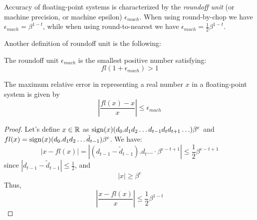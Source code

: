 \begin{definition}
    Accuracy of floating-point systems is characterized by the \textit{roundoff unit} (or machine precision, or machine epsilon) $\epsilon_{mach}$. When using round-by-chop we have $\epsilon_{mach} = \beta^{1-t}$, while when using round-to-nearest we have $\epsilon_{mach} = \frac{1}{2}\beta^{1-t}$.
\end{definition}

Another definition of roundoff unit is the following:
\begin{definition}
    The roundoff unit $\epsilon_{mach}$ is the smallest positive number satisfying:
    $$ fl(1+\epsilon_{mach}) > 1 $$
\end{definition}

\begin{proposition}
    The maximum relative error in representing a real number $x$ in a floating-point system is given by
    $$ \left| \frac{fl(x) - x}{x} \right| \leq \epsilon_{mach} $$
\end{proposition}

\begin{proof}
    Let's define $x \in \mathbb{R}$ as $\mathrm{sign}(x)(d_0.d_1d_2 \hdots d_{t-1}d_{t}d_{t+1} \hdots)\beta^{e}$ and $fl(x) = \mathrm{sign}(x)(d_0.d_1d_2 \hdots \tilde{d}_{t-1})\beta^{e}$. We have:
    $$ |x - fl(x)| = |(d_{t-1}-\tilde{d}_{t-1}).d_{t} \hdots \cdot \beta^{e-t+1}| \leq \frac{1}{2}\beta^{e-t+1} $$
    since $|d_{t-1} - \tilde{d}_{t-1}| \leq \frac{1}{2}$, and
    $$ |x| \geq \beta^{e} $$
    Thus,
    $$ \left| \frac{x-fl(x)}{x} \right| \leq \frac{1}{2}\beta^{1-t} $$
\end{proof}
